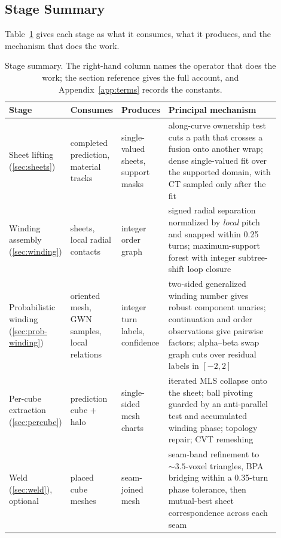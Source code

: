 \subsection{Stage Summary}

Table~\ref{tab:contracts} gives each stage as what it consumes, what it produces, and the mechanism that does the work.

\begin{table}[t]
  \caption{Stage summary. The right-hand column names the operator that does the work; the section reference gives the full account, and Appendix~\ref{app:terms} records the constants.}
  \label{tab:contracts}
  \centering
  \small
    \begin{tabular}{@{}p{0.13\linewidth}p{0.17\linewidth}p{0.17\linewidth}p{0.43\linewidth}@{}}
    \toprule
    Stage & Consumes & Produces & Principal mechanism \\
    \midrule
    Sheet lifting (\ref{sec:sheets}) &
      completed prediction, material tracks &
      single-valued sheets, support masks &
      along-curve ownership test cuts a path that crosses a fusion onto another wrap; dense single-valued fit over the supported domain, with CT sampled only after the fit \\
    \addlinespace[2pt]
    Winding assembly (\ref{sec:winding}) &
      sheets, local radial contacts &
      integer order graph &
      signed radial separation normalized by \emph{local} pitch and snapped within 0.25 turns; maximum-support forest with integer subtree-shift loop closure \\
    \addlinespace[2pt]
    Probabilistic winding (\ref{sec:prob-winding}) &
      oriented mesh, GWN samples, local relations &
      integer turn labels, confidence &
      two-sided generalized winding number gives robust component unaries; continuation and order observations give pairwise factors; alpha--beta swap graph cuts over residual labels in $[-2,2]$ \\
    \addlinespace[2pt]
    Per-cube extraction (\ref{sec:percube}) &
      prediction cube + halo &
      single-sided mesh charts &
      iterated MLS collapse onto the sheet; ball pivoting guarded by an anti-parallel test and accumulated winding phase; topology repair; CVT remeshing \\
    \addlinespace[2pt]
    Weld (\ref{sec:weld}), optional &
      placed cube meshes &
      seam-joined mesh &
      seam-band refinement to ${\sim}3.5$-voxel triangles, BPA bridging within a 0.35-turn phase tolerance, then mutual-best sheet correspondence across each seam \\

\end{tabular}
\end{table}
